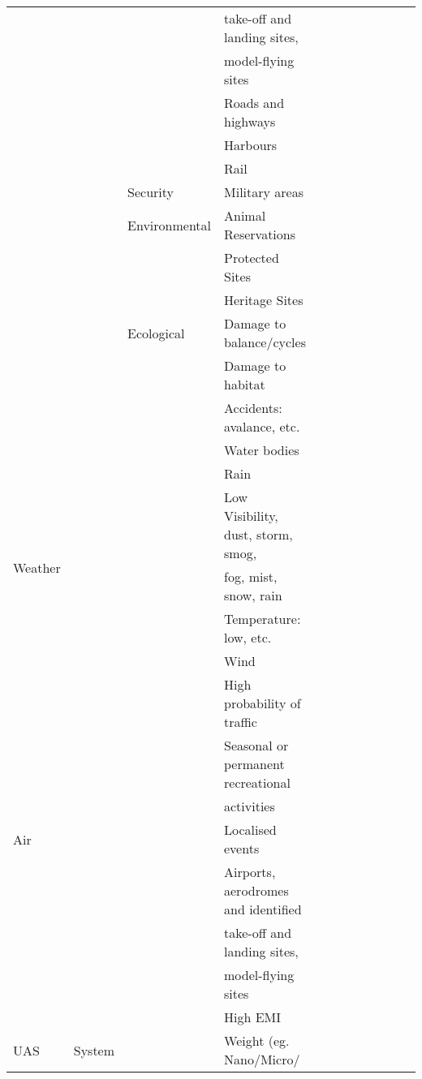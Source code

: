 \documentclass{report}
\begin{document}
\begin{centering}
\begin{longtable}{|l|l|l|l|c|c|c|c|c|c|c|c|}
  & & & take-off and landing sites, & & & & & & & & \\
  & & & model-flying sites & & & & & & & & \\\cline{4-4}
  & & & Roads and highways & & & & & & & & \\\cline{4-4}
  & & & Harbours & & & & & & & & \\\cline{4-4}
  & & & Rail & & & & & & & & \\\cline{3-4}
  & & Security & Military areas & & & & & & & & \\\cline{3-4}
  & & Environmental & Animal Reservations & & & & & & & & \\\cline{4-4}
  & & & Protected Sites & & & & & & & & \\\cline{4-4}
  & & & Heritage Sites & & & & & & & & \\\cline{3-4}
  & & Ecological & Damage to balance/cycles & & & & & & & & \\\cline{4-4}
  & & & Damage to habitat & & & & & & & & \\\cline{4-4}
  & & & Accidents: avalance, etc. & & & & & & & & \\\cline{4-4}
  & & & Water bodies & & & & & & & & \\\cline{1-4}
  \multirow{5}{3em}{Weather} & & & Rain & & & & & & & & \\\cline{4-4}
  & & & Low Visibility, dust, storm, smog, & & & & & & & & \\\cline{4-4}
  & & & fog, mist, snow, rain & & & & & & & & \\\cline{4-4}
  & & & Temperature: low, etc. & & & & & & & & \\\cline{4-4}
  & & & Wind & & & & & & & & \\\cline{1-4}
  \multirow{7}{3em}{Air} & & & High probability of traffic & & & & & & & & \\\cline{4-4}
  & & & Seasonal or permanent recreational & & & & & & & & \\
  & & & activities & & & & & & & & \\\cline{4-4}
  & & & Localised events & & & & & & & & \\\cline{4-4}
  & & & Airports, aerodromes and identified &  & & & & & & & \\
  & & & take-off and landing sites,  & & & & & & & & \\
  & & & model-flying sites & & & & & & & & \\\cline{4-4}
  & & & High EMI & & & & & & & & \\\cline{1-4}
  \multirow{15}{3em}{UAS} & \multirow{5}{7em}{System} & & Weight (eg. Nano/Micro/ & & & & & & & & \\

\end{longtable}
\end{centering}
\end{document}
